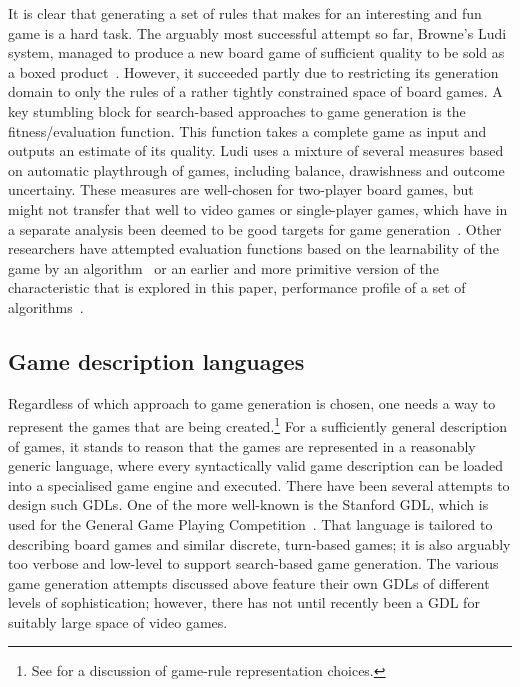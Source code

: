 \documentclass{llncs}
\begin{document}
It is clear that generating a set of rules that makes for an interesting and fun game is a hard task. The arguably most successful attempt so far, Browne's Ludi system, managed to produce a new board game of sufficient quality to be sold as a boxed product~\cite{browne2008automated}. However, it succeeded partly due to restricting its generation domain to only the rules of a rather tightly constrained space of board games. A key stumbling block for search-based approaches to game generation is the fitness/evaluation function. This function takes a complete game as input and outputs an estimate of its quality. Ludi uses a mixture of several measures based on automatic playthrough of games, including balance, drawishness and outcome uncertainy. These measures are well-chosen for two-player board games, but might not transfer that well to video games or single-player games, which have in a separate analysis been deemed to be good targets for game generation~\cite{togelius2014characteristics}. Other researchers have attempted evaluation functions based on the learnability of the game by an algorithm~\cite{togelius2008experiment} or an earlier and more primitive version of the characteristic that is explored in this paper, performance profile of a set of algorithms~\cite{font2013towards}.

\subsection{Game description languages}

Regardless of which approach to game generation is chosen, one needs a way to represent the games that are being created.\footnote{See \cite{pcgbook:ch6} for a discussion of game-rule representation choices.} For a sufficiently general description of games, it stands to reason that the games are represented in a reasonably generic language, where every syntactically valid game description can be loaded into a specialised game engine and executed. There have been several attempts to design such GDLs. One of the more well-known is the Stanford GDL, which is used for the General Game Playing Competition~\cite{genesereth2005general}. That language is tailored to describing board games and similar discrete, turn-based games; it is also arguably too verbose and low-level to support search-based game generation. The various game generation attempts discussed above feature their own GDLs of different levels of sophistication; however, there has not until recently been a GDL for suitably large space of video games.
\end{document}
